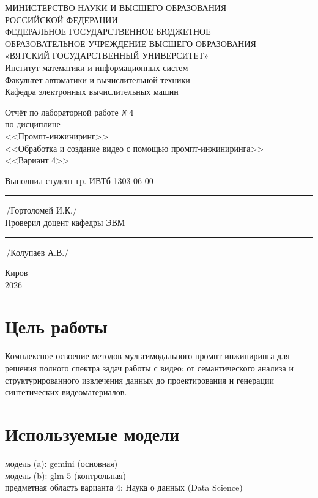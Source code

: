 \documentclass[oneside,a4paper,14pt]{extarticle}
\begin{document}
\newpage\thispagestyle{empty}
\begin{center}
МИНИСТЕРСТВО НАУКИ И ВЫСШЕГО ОБРАЗОВАНИЯ\\
РОССИЙСКОЙ ФЕДЕРАЦИИ\\
ФЕДЕРАЛЬНОЕ ГОСУДАРСТВЕННОЕ БЮДЖЕТНОЕ\\
ОБРАЗОВАТЕЛЬНОЕ УЧРЕЖДЕНИЕ ВЫСШЕГО ОБРАЗОВАНИЯ\\
«ВЯТСКИЙ ГОСУДАРСТВЕННЫЙ УНИВЕРСИТЕТ»\\
Институт математики и информационных систем\\
Факультет автоматики и вычислительной техники\\
Кафедра электронных вычислительных машин
\end{center}
\vspace{20mm}
\begin{center}
Отчёт по лабораторной работе №4\\
по дисциплине\\
<<Промпт-инжиниринг>>\\
<<Обработка и создание видео с помощью промпт-инжиниринга>>\\
<<Вариант 4>>\\
\end{center}
\vspace{48mm}
\noindent
Выполнил студент гр. ИВТб-1303-06-00 \hfill \rule[-0.5mm]{30mm}{0.15mm}\,/Гортоломей И.К./\\[0.5cm]
Проверил доцент кафедры ЭВМ \hfill \rule[-0.5mm]{30mm}{0.15mm}\,/Колупаев А.В./
\vfill
\begin{center}
Киров\\
2026
\end{center}
\newpage
\thispagestyle{empty}
\newpage

\section*{Цель работы}
Комплексное освоение методов мультимодального промпт-инжиниринга для решения полного спектра задач работы с видео: от семантического анализа и структурированного извлечения данных до проектирования и генерации синтетических видеоматериалов.

\section*{Используемые модели}
\noindent
\indent модель (a): gemini (основная)\\
\indent модель (b): glm-5 (контрольная)\\
\indent предметная область варианта 4: Наука о данных (Data Science)
\newpage
\end{document}
